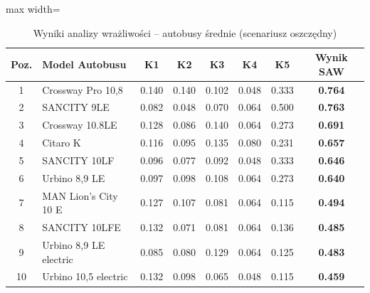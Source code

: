 \begin{table}[H]
    \centering
    \caption{Wyniki analizy wrażliwości -- autobusy średnie (scenariusz oszczędny)}
    \vspace{0.2cm}
    \begin{adjustbox}{max width=\textwidth}
    \begin{tabular}{|c|l|c|c|c|c|c|c|}
        \hline
        \textbf{Poz.} & \textbf{Model Autobusu} & \textbf{K1} & \textbf{K2} & \textbf{K3} & \textbf{K4} & \textbf{K5} & \textbf{Wynik SAW} \\ \hline
        1 & Crossway Pro 10,8      & 0.140 & 0.140 & 0.102 & 0.048 & 0.333 & \textbf{0.764} \\ \hline
        2 & SANCITY 9LE            & 0.082 & 0.048 & 0.070 & 0.064 & 0.500 & \textbf{0.763} \\ \hline
        3 & Crossway 10.8LE        & 0.128 & 0.086 & 0.140 & 0.064 & 0.273 & \textbf{0.691} \\ \hline
        4 & Citaro K               & 0.116 & 0.095 & 0.135 & 0.080 & 0.231 & \textbf{0.657} \\ \hline
        5 & SANCITY 10LF           & 0.096 & 0.077 & 0.092 & 0.048 & 0.333 & \textbf{0.646} \\ \hline
        6 & Urbino 8,9 LE          & 0.097 & 0.098 & 0.108 & 0.064 & 0.273 & \textbf{0.640} \\ \hline
        7 & MAN Lion's City 10 E   & 0.127 & 0.107 & 0.081 & 0.064 & 0.115 & \textbf{0.494} \\ \hline
        8 & SANCITY 10LFE          & 0.132 & 0.071 & 0.081 & 0.064 & 0.136 & \textbf{0.485} \\ \hline
        9 & Urbino 8,9 LE electric & 0.085 & 0.080 & 0.129 & 0.064 & 0.125 & \textbf{0.483} \\ \hline
        10 & Urbino 10,5 electric  & 0.132 & 0.098 & 0.065 & 0.048 & 0.115 & \textbf{0.459} \\ \hline
    \end{tabular}
    \end{adjustbox}
\end{table}

